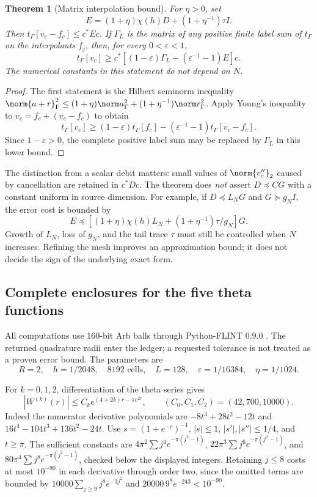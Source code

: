 \documentclass[11pt,a4paper]{article}
\numberwithin{equation}{section}
\newtheorem{theorem}{Theorem}[section]
\theoremstyle{definition}\newtheorem{definition}[theorem]{Definition}
\theoremstyle{remark}\newtheorem{remark}[theorem]{Remark}
\begin{document}
\begin{theorem}[Matrix interpolation bound]\label{fz5:thm:interp}
For $\eta>0$, set
\[
 E=(1+\eta)\chi(h)D+(1+\eta^{-1})\tau I.
\]
Then $t_\Gamma[v_c-f_c]\le c^*Ec$. If $\Gamma_L$ is the matrix of any
positive finite label sum of $t_\Gamma$ on the interpolants $f_j$, then,
for every $0<\varepsilon<1$,
\begin{equation}\label{fz5:eq:matrix-error}
 \boxed{t_\Gamma[v_c]\ge
 c^*\left[(1-\varepsilon)\Gamma_L
                -(\varepsilon^{-1}-1)E\right]c.}
\end{equation}
The numerical constants in this statement do not depend on $N$.
\end{theorem}
\begin{proof}
The first statement is the Hilbert seminorm inequality
$\norm{a+r}_\Gamma^2\le(1+\eta)\norm a_\Gamma^2+
(1+\eta^{-1})\norm r_\Gamma^2$.
Apply Young's inequality to $v_c=f_c+(v_c-f_c)$ to obtain
\[
 t_\Gamma[v_c]\ge(1-\varepsilon)t_\Gamma[f_c]
             -(\varepsilon^{-1}-1)t_\Gamma[v_c-f_c].
\]
Since $1-\varepsilon>0$, the complete positive label sum may be
replaced by $\Gamma_L$ in this lower bound.
\end{proof}

The distinction from a scalar debit matters: small values of
$\norm{v_c''}_2$ caused by cancellation are retained in $c^*Dc$.
The theorem does \emph{not} assert $D\preceq C G$ with a constant uniform
in source dimension. For example, if $D\preceq L_NG$ and
$G\succeq g_NI$, the error cost is bounded by
\[
 E\preceq\left[(1+\eta)\chi(h)L_N+
                   (1+\eta^{-1})\tau/g_N\right]G.
\]
Growth of $L_N$, loss of $g_N$, and the tail trace $\tau$ must still be
controlled when $N$ increases. Refining the mesh improves an approximation
bound; it does not decide the sign of the underlying exact form.

\subsection{Complete enclosures for the five theta functions}
All computations use 160-bit Arb balls through Python-FLINT 0.9.0
\cite{fzFlintIntegral,fzArbIntegration}. The returned quadrature radii enter
the ledger; a requested tolerance is not treated as a proven error bound.
The parameters are
\[
 R=2,\quad h=1/2048,\quad 8192\text{ cells},\quad L=128,
 \quad\varepsilon=1/16384,\quad\eta=1/1024.
\]

For $k=0,1,2$, differentiation of the theta series gives
\begin{equation}\label{fz5:eq:env}
 |W^{(k)}(r)|\le C_ke^{(4+2k)r-\pi e^{2r}},\qquad
 (C_0,C_1,C_2)=(42,700,10000).
\end{equation}
Indeed the numerator derivative polynomials are
$-8t^3+28t^2-12t$ and $16t^4-104t^3+136t^2-24t$.
Use $s=(1+e^{-r})^{-1}$, $|s|\le1$, $|s'|,|s''|\le1/4$, and $t\ge\pi$.
The sufficient constants are
$4\pi^2\sum j^4e^{-\pi(j^2-1)}$,
$22\pi^3\sum j^6e^{-\pi(j^2-1)}$, and
$80\pi^4\sum j^8e^{-\pi(j^2-1)}$, checked below the displayed integers.
Retaining $j\le8$ costs at most $10^{-90}$ in each derivative through
order two, since the omitted terms are bounded by
$10000\sum_{j\ge9}j^8e^{-3j^2}$ and
$20000\,9^8e^{-243}<10^{-90}$.
\end{document}
